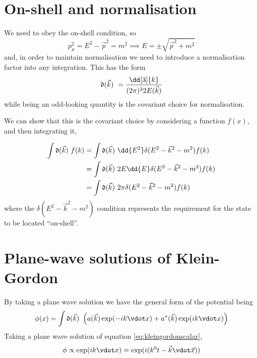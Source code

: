 \section{On-shell and normalisation}
\label{sec:norm-meas}

We need to obey the on-shell condition, so
\begin{equation}
  \label{eq:49}
  p^2_\mu = E^2 -\vec{p}^2 = m^2 \implies E = \pm \sqrt{\vec{p}^2 + m^2}
\end{equation}
and, in order to maintain normalisation we need to introduce a
normalisation factor into any integration. This has the form
\[ \nm{\vec{k}} = \frac{\dd[3]{k}}{(2 \pi)^3 2 E(\vec{k})} \] 
while being an odd-looking quantity is the covariant choice
for normalisation. 

\begin{derivation}
  We can show that this is the covariant choice by considering a
  function $f(x)$, and then integrating it,

\begin{align*}
  \int \nm{\vec{k}} f(k) &= \int  \nm{\vec{k}} \dd{E^2} \delta(E^2 - \vec{k}^2 - m^2) f(k) \\ &
=  \int  \nm{\vec{k}} 2 E\dd{E} \delta(E^2 - \vec{k}^2 - m^2) f(k) \\
&=  \int  \nm{\vec{k}} 2 \pi\delta(E^2 - \vec{k}^2 - m^2) f(k) 
\end{align*}
where the $\delta(E^2 - \vec{k}^2 - m^2)$ condition represents the
requirement for the state to be located ``on-shell''.
\end{derivation}

\section{Plane-wave solutions of Klein-Gordon}
\label{sec:plane-wave-solutions}

By taking a plane wave solution we have the general form of the
potential being
  \begin{equation}
    \phi(x) = \int \nm{\vec{k}} \left(
      a(\vec{k}) \exp(- i k \vdot x) + a^{*}(\vec{k}) \exp(i k \vdot
      x) \right)
  \end{equation}
  Taking a plane wave solution of equation \ref{eq:kleingordonscalar},
  \[ \phi \propto \exp(i k \vdot x) = \exp( i (k^0 t - \vec{k} \vdot
  \vec{x})) \]

